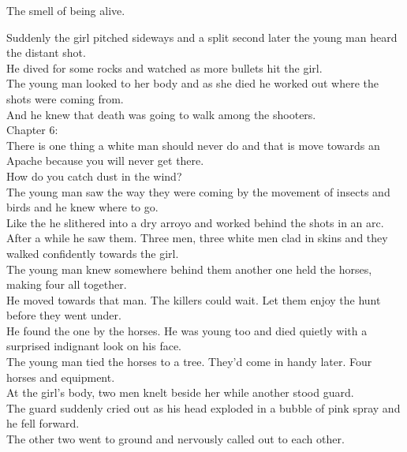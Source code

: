 The smell of being alive. \\




Suddenly the girl pitched sideways and a split second later the young man heard the distant shot. \\
He dived for some rocks and watched as more bullets hit the girl. \\
The young man looked to her body and as she died he worked out where the shots were coming from. \\

And he knew that death was going to walk among the shooters. \\

Chapter 6: \\

There is one thing a white man should never do and that is move towards an Apache because you will never get there. \\
How do you catch dust in the wind? \\
The young man saw the way they were coming by the movement of insects and birds and he knew where to go. \\
Like the  he slithered into a dry arroyo and worked behind the shots in an arc. \\

After a while he saw them. Three men, three white men clad in skins and they walked confidently towards the girl. \\
The young man knew somewhere behind them another one held the horses, making four all together. \\

He moved towards that man. The killers could wait. Let them enjoy the hunt before they went under. \\
He found the one by the horses. He was young too and died quietly with a surprised indignant look on his face. \\
The young man tied the horses to a tree. They'd come in handy later. Four horses and equipment. \\

At the girl's body, two men knelt beside her while another stood guard. \\
The guard suddenly cried out as his head exploded in a bubble of pink spray and he fell forward. \\
The other two went to ground and nervously called out to each other. \\

